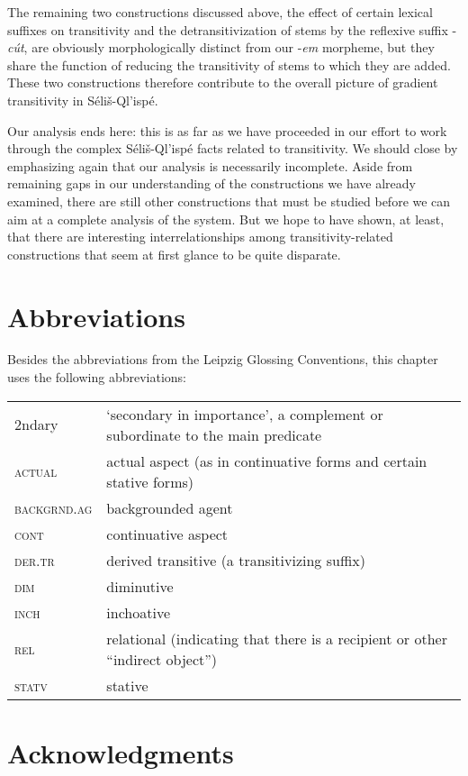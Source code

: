 \documentclass[output=paper,colorlinks,citecolor=brown]{langscibook}
\begin{document}
The remaining two constructions discussed above, the effect of certain
lexical suffixes on transitivity and the detransitivization of stems
by the reflexive suffix -\emph{c\'ut}, are obviously morphologically
distinct from our -\emph{em} morpheme, but they share the function of
reducing the transitivity of stems to which they are added.  These two
constructions therefore contribute to the overall picture of gradient
transitivity in S\'eli\v{s}-Ql'isp\'e.

Our analysis ends here: this is as far as we have proceeded in our
effort to work through the complex S\'eli\v{s}-Ql'isp\'e facts related
to transitivity.  We should close by emphasizing again that our
analysis is necessarily incomplete.  Aside from remaining gaps in our
understanding of the constructions we have already examined, there are
still other constructions that must be studied before we can aim at a
complete analysis of the system.  But we hope to have shown, at least,
that there are interesting interrelationships among
transitivity-related constructions that seem at first glance to be
quite disparate.

\section*{Abbreviations}\largerpage[2]
Besides the abbreviations from the Leipzig Glossing Conventions, this chapter uses the following
abbreviations:\smallskip\\
\noindent\begin{tabularx}{\textwidth}{@{}lQ@{}}
2ndary & `secondary in importance', a complement or subordinate to
  the main predicate \\
\textsc{actual} & actual aspect (as in continuative forms and certain stative forms) \\
\textsc{backgrnd.ag} & backgrounded agent \\
\textsc{cont} & continuative aspect \\
\textsc{der.tr} & derived transitive (a transitivizing suffix) \\
\textsc{dim} & diminutive \\
\textsc{inch} & inchoative \\
\textsc{rel} & relational (indicating that there is a recipient or other ``indirect object'') \\
\textsc{statv} & stative \\
\end{tabularx}


\section*{Acknowledgments}
\end{document}

